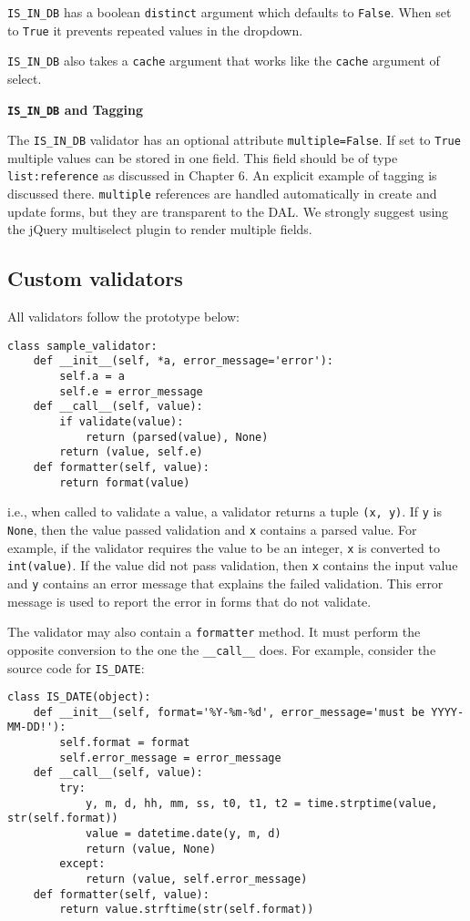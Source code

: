 \documentclass[justified,sixbynine,notoc]{tufte-book}
\def\ft{\small\tt}
\def\inxx#1{\index{#1}}
\begin{document}
\begin{fullwidth}
{\ft IS\_IN\_DB} has a boolean {\ft distinct} argument which defaults to {\ft False}. When set to {\ft True} it prevents repeated values in the dropdown.

{\ft IS\_IN\_DB} also takes a {\ft cache} argument that works like the {\ft cache} argument of select.

{\bf {\ft IS\_IN\_DB} and Tagging}

\inxx{tags}
\inxx{multiple}

The {\ft IS\_IN\_DB} validator has an optional attribute {\ft multiple=False}. If set to {\ft True} multiple values can be stored in one field. This field should be of type {\ft list:reference} as discussed in Chapter 6. An explicit example of tagging is discussed there. {\ft multiple} references are handled automatically in create and update forms, but they are transparent to the DAL. We strongly suggest using the jQuery multiselect plugin to render multiple fields.

\goodbreak\subsection{Custom validators}

\inxx{custom validator}

All validators follow the prototype below:
\begin{lstlisting}
class sample_validator:
    def __init__(self, *a, error_message='error'):
        self.a = a
        self.e = error_message
    def __call__(self, value):
        if validate(value):
            return (parsed(value), None)
        return (value, self.e)
    def formatter(self, value):
        return format(value)
\end{lstlisting}
\noindent i.e., when called to validate a value, a validator returns a tuple {\ft (x, y)}. If {\ft y} is {\ft None}, then the value passed validation and {\ft x} contains a parsed value. For example, if the validator requires the value to be an integer, {\ft x} is converted to {\ft int(value)}. If the value did not pass validation, then {\ft x} contains the input value and {\ft y} contains an error message that explains the failed validation. This error message is used to report the error in forms that do not validate.

The validator may also contain a {\ft formatter} method. It must perform the opposite conversion to the one the {\ft \_\_call\_\_} does. For example, consider the source code for {\ft IS\_DATE}:
\begin{lstlisting}
class IS_DATE(object):
    def __init__(self, format='%Y-%m-%d', error_message='must be YYYY-MM-DD!'):
        self.format = format
        self.error_message = error_message
    def __call__(self, value):
        try:
            y, m, d, hh, mm, ss, t0, t1, t2 = time.strptime(value, str(self.format))
            value = datetime.date(y, m, d)
            return (value, None)
        except:
            return (value, self.error_message)
    def formatter(self, value):
        return value.strftime(str(self.format))
\end{lstlisting}


\end{fullwidth}
\end{document}
